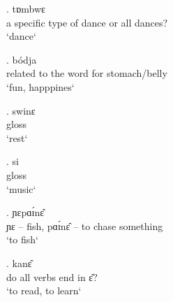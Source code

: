 \documentclass{assets/fieldnotes}
\begin{document}
\exg. tɒmbwɛ\\
a specific type of dance or all dances? \\
`dance`

\exg. bódja\\
related to the word for stomach/belly \\
`fun, happpines`

\exg. swinɛ\\
gloss\\ 
`rest`


\exg. si\\
gloss\\ 
`music`


\exg. ɲɛpɑɪ́nɛ̂\\
ɲɛ – fish, pɑɪ́nɛ̂ – to chase something \\
`to fish`

\exg. kanɛ̂\\
do all verbs end in ɛ̂? \\
`to read, to learn`



\newpage 
\end{document}
